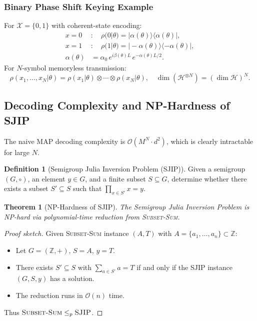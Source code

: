 \documentclass[12pt,a4paper]{article}
\theoremstyle{definition}
\newtheorem{definition}{Definition}[section]
\theoremstyle{plain}
\newtheorem{theorem}{Theorem}[section]
\newcommand{\Z}{\mathbb{Z}}
\newcommand{\tensor}{\otimes}
\begin{document}
\subsubsection{Binary Phase Shift Keying Example}

For $\mathcal{X}=\{0,1\}$ with coherent-state encoding:
\begin{align}
x=0 &:\quad \rho(0|\theta)=|\alpha(\theta)\rangle\langle\alpha(\theta)|, \\
x=1 &:\quad \rho(1|\theta)=|-\alpha(\theta)\rangle\langle-\alpha(\theta)|, \\
\alpha(\theta) &= \alpha_0\,e^{i\beta(\theta)L}\,e^{-\alpha(\theta)L/2}.
\end{align}
For $N$-symbol memoryless transmission:
\begin{equation}
\rho(x_1,\dots,x_N|\theta)=\rho(x_1|\theta)\tensor\cdots\tensor\rho(x_N|\theta),\quad
\dim(\mathcal{H}^{\tensor N})=(\dim\mathcal{H})^N.
\end{equation}

\subsection{Decoding Complexity and NP-Hardness of SJIP}
\label{sec:week1_complexity}

The naive MAP decoding complexity is $\mathcal{O}(M^N\cdot d^2)$, which is clearly intractable
for large $N$.

\begin{definition}[Semigroup Julia Inversion Problem (SJIP)]
Given a semigroup $(G,\circ)$, an element $y\in G$, and a finite subset $S\subseteq G$,
determine whether there exists a subset $S'\subseteq S$ such that $\prod_{x\in S'}x=y$.
\end{definition}

\begin{theorem}[NP-Hardness of SJIP]
The Semigroup Julia Inversion Problem is NP-hard via polynomial-time reduction from
\textsc{Subset-Sum}.
\end{theorem}

\begin{proof}[Proof sketch]
Given \textsc{Subset-Sum} instance $(A,T)$ with $A=\{a_1,\dots,a_n\}\subset\Z$:
\begin{itemize}
  \item Let $G=(\Z,+)$, $S=A$, $y=T$.
  \item There exists $S'\subseteq S$ with $\sum_{a\in S'}a=T$ if and only if the
    SJIP instance $(G,S,y)$ has a solution.
  \item The reduction runs in $\mathcal{O}(n)$ time.
\end{itemize}
Thus $\textsc{Subset-Sum}\le_p\textsc{SJIP}$.
\end{proof}
\end{document}
